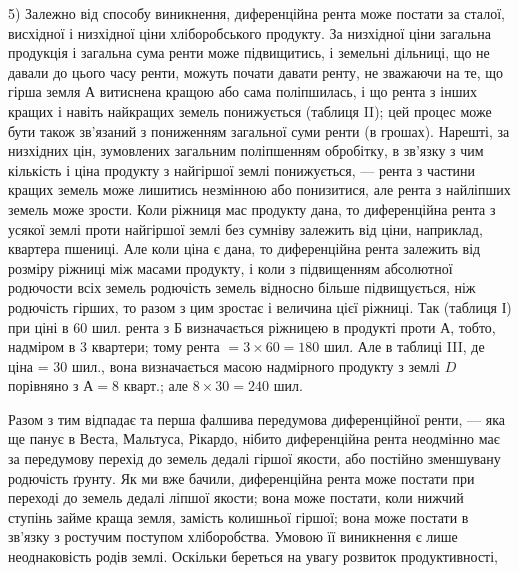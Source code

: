 5) Залежно від способу виникнення, диференційна рента може постати за сталої, висхідної і низхідної
ціни хліборобського продукту. За низхідної ціни загальна продукція і загальна сума ренти може
підвищитись, і земельні дільниці, що не давали до цього часу ренти, можуть почати давати ренту, не
зважаючи на те, що гірша земля $А$ витиснена кращою або сама поліпшилась, і що рента з інших кращих і
навіть найкращих земель понижується (таблиця II);
цей процес може бути також зв’язаний з пониженням загальної суми ренти (в грошах). Нарешті, за
низхідних цін, зумовлених загальним поліпшенням обробітку, в зв’язку з чим кількість і ціна продукту
з найгіршої землі понижується, — рента з частини кращих земель може лишитись незмінною або
понизитися, але рента з найліпших земель може зрости. Коли ріжниця мас продукту дана, то
диференційна рента з усякої землі проти найгіршої землі без сумніву залежить від ціни, наприклад,
квартера пшениці. Але коли ціна є дана, то диференційна рента залежить від розміру ріжниці між
масами продукту, і коли з підвищенням абсолютної родючости всіх земель родючість земель відносно
більше підвищується, ніж родючість гірших, то разом з цим зростає і величина цієї ріжниці. Так
(таблиця І) при ціні в 60 шил. рента з Б визначається ріжницею в продукті проти А, тобто, надміром в
3 квартери; тому рента $= 3 × 60 = 180$ шил. Але в таблиці III, де ціна = 30 шил., вона визначається
масою надмірного продукту з землі $D$ порівняно з $А = 8$ кварт.; але $8 × 30 = 240$ шил.

Разом з тим відпадає та перша фалшива передумова диференційної ренти, — яка ще панує в Веста,
Мальтуса, Рікардо, нібито диференційна рента неодмінно має за передумову перехід до земель дедалі
гіршої якости, або постійно зменшувану родючість ґрунту. Як ми вже бачили, диференційна рента може
постати при переході до земель дедалі ліпшої якости; вона може постати, коли нижчий ступінь займе
краща земля, замість колишньої гіршої; вона може постати в зв’язку з ростучим поступом хліборобства.
Умовою її виникнення є лише неоднаковість родів землі. Оскільки береться на увагу розвиток
продуктивності,
\parbreak{}  %
